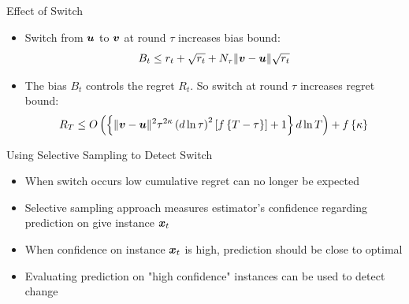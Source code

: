 \documentclass{beamer}
\begin{document}
\begin{frame}{Effect of Switch}
\begin{itemize}
\item Switch from ${\boldsymbol{u}}$ to ${\boldsymbol{v}}$ at round $\tau$ increases bias bound:\newline
\newline
\begin{equation*}
B_t\leq r_t+\sqrt{r_t}+N_{\tau}\|{\boldsymbol{v}}-{\boldsymbol{u}}\|\sqrt{r_t}
\end{equation*}\newline
\item The bias $B_t$ controls the regret $R_t$. So switch at round $\tau$ increases regret bound:\newline\newline
\begin{equation*}
 R_T\leq O\left(\left\{\|{\boldsymbol{v}}-{\boldsymbol{u}}\|^2{\tau}^{2\kappa}\left(d\ln{\tau}\right)^2\left[f\left\{T-\tau\right\}\right]+1\right\}d\ln{T}\right)+f\left\{\kappa\right\}
\end{equation*}
\end{itemize}
\end{frame}

\begin{frame}{Using Selective Sampling to Detect Switch}
\begin{itemize}
\item When switch occurs low cumulative regret can no longer be expected \newline
\item Selective sampling approach measures estimator's confidence regarding prediction on give instance ${\boldsymbol{x}}_{t}$ \newline
\item When confidence on instance ${\boldsymbol{x}}_{t}$ is high, prediction should be close to optimal \newline
\item Evaluating prediction on "high confidence" instances can be used to detect change \newline
\end{itemize}


\end{frame}
\end{document}
